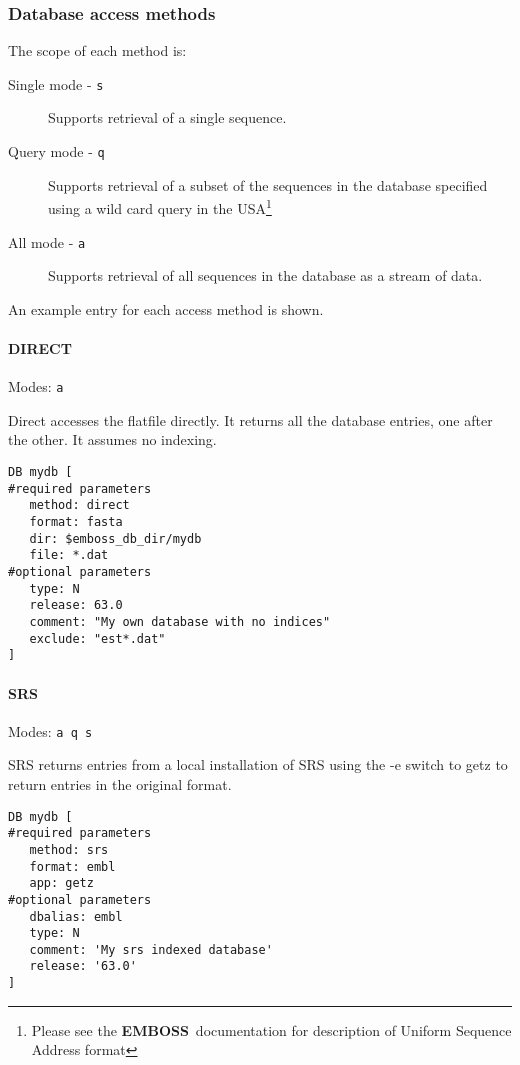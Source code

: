 \documentclass{report}
\newcommand{\ilcomm}[1]{{\tt #1}}
\newcommand{\EMBOSS}{{\sf\bfseries EMBOSS}}
\begin{document}
\subsubsection{Database access methods}

The scope of each method is:
\begin{description}
\item[Single mode - \ilcomm{s}] Supports retrieval of a single sequence.
\item[Query mode - \ilcomm{q}] Supports retrieval of a subset of the sequences in the database specified using a wild card query in the USA\footnote{Please see the \EMBOSS\ documentation for description of Uniform Sequence Address format}
\item[All mode - \ilcomm{a}] Supports retrieval of all sequences in the database as a stream of data.
\end{description}

An example entry for each access method is shown.

\paragraph{DIRECT}\par\noindent
Modes: \ilcomm{a}\par\noindent
Direct accesses the flatfile directly. It returns all the database entries, one after the other. It assumes no indexing.
 
\begin{verbatim}
DB mydb [ 
#required parameters
   method: direct
   format: fasta
   dir: $emboss_db_dir/mydb
   file: *.dat   
#optional parameters
   type: N
   release: 63.0
   comment: "My own database with no indices"
   exclude: "est*.dat"
]
\end{verbatim}

\paragraph{SRS}\par\noindent
Modes: \ilcomm{a q s}\par\noindent
SRS returns entries from a local installation of SRS using the -e switch to getz to return entries in the original format.

\begin{verbatim}
DB mydb [
#required parameters
   method: srs
   format: embl
   app: getz
#optional parameters
   dbalias: embl
   type: N
   comment: 'My srs indexed database'
   release: '63.0'
]
\end{verbatim}
\end{document}
